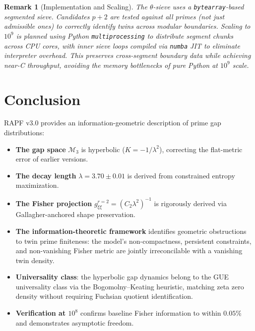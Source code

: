 \documentclass[12pt]{article}
\newtheorem{remark}[theorem]{Remark}
\begin{document}
\begin{remark}[Implementation and Scaling]
The $\theta$-sieve uses a \texttt{bytearray}-based segmented sieve. Candidates
$p+2$ are tested against \textit{all} primes (not just admissible ones) to
correctly identify twins across modular boundaries.
Scaling to $10^9$ is planned using Python \texttt{multiprocessing} to distribute
segment chunks across CPU cores, with inner sieve loops compiled via \texttt{numba}
JIT to eliminate interpreter overhead. This preserves cross-segment boundary data
while achieving near-C throughput, avoiding the memory bottlenecks of pure Python
at $10^9$ scale.
\end{remark}

\section{Conclusion}

RAPF v3.0 provides an information-geometric description of prime gap distributions:

\begin{itemize}
  \item \textbf{The gap space} $\mathcal{M}_3$ is hyperbolic ($K = -1/\lambda^2$),
    correcting the flat-metric error of earlier versions.
  \item \textbf{The decay length} $\lambda = 3.70 \pm 0.01$ is derived from
    constrained entropy maximization.
  \item \textbf{The Fisher projection} $g_{\xi\xi}^{r=2} = (C_2\lambda^2)^{-1}$
    is rigorously derived via Gallagher-anchored shape preservation.
  \item \textbf{The information-theoretic framework} identifies geometric obstructions
    to twin prime finiteness: the model's non-compactness, persistent constraints,
    and non-vanishing Fisher metric are jointly irreconcilable with a vanishing
    twin density.
  \item \textbf{Universality class}: the hyperbolic gap dynamics belong to the GUE
    universality class via the Bogomolny--Keating heuristic, matching zeta zero
    density without requiring Fuchsian quotient identification.
  \item \textbf{Verification at $10^8$} confirms baseline Fisher information to
    within $0.05\%$ and demonstrates asymptotic freedom.
\end{itemize}
\end{document}
